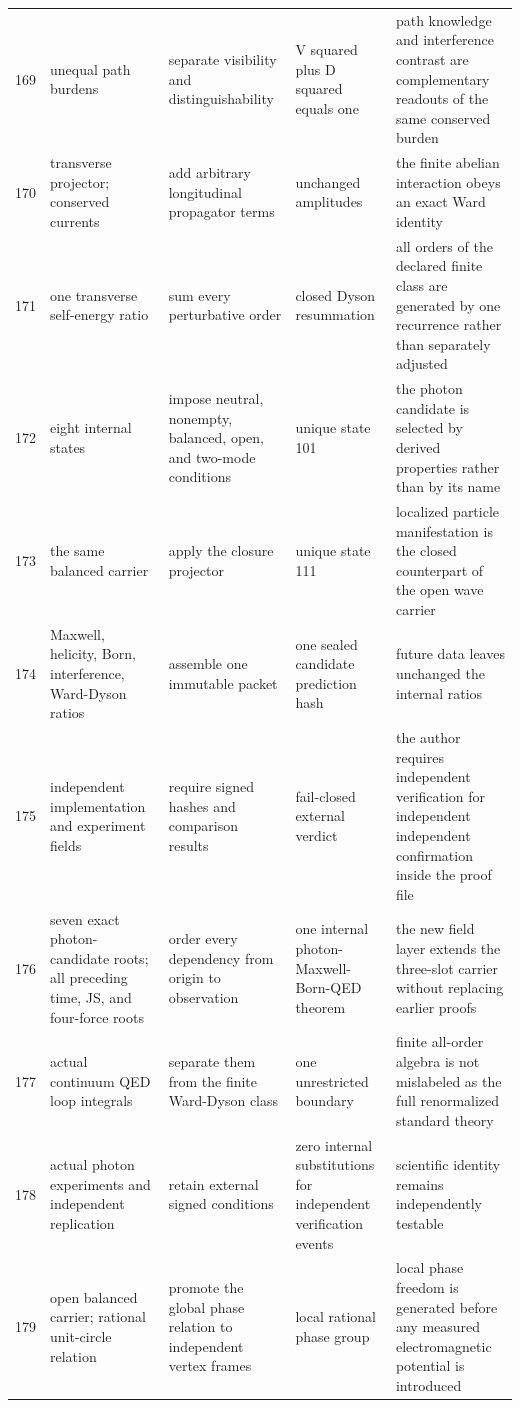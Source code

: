 \documentclass[11pt]{article}
\numberwithin{equation}{section}
\theoremstyle{remark}
\begin{document}
\begin{landscape}
\begin{longtable}{p{0.65cm}p{3.5cm}p{4.0cm}p{4.0cm}p{4.6cm}}
169&unequal path burdens&separate visibility and distinguishability&V squared plus D squared equals one&path knowledge and interference contrast are complementary readouts of the same conserved burden\\
170&transverse projector; conserved currents&add arbitrary longitudinal propagator terms&unchanged amplitudes&the finite abelian interaction obeys an exact Ward identity\\
171&one transverse self-energy ratio&sum every perturbative order&closed Dyson resummation&all orders of the declared finite class are generated by one recurrence rather than separately adjusted\\
172&eight internal states&impose neutral, nonempty, balanced, open, and two-mode conditions&unique state 101&the photon candidate is selected by derived properties rather than by its name\\
173&the same balanced carrier&apply the closure projector&unique state 111&localized particle manifestation is the closed counterpart of the open wave carrier\\
174&Maxwell, helicity, Born, interference, Ward-Dyson ratios&assemble one immutable packet&one sealed candidate prediction hash&future data leaves unchanged the internal ratios\\
175&independent implementation and experiment fields&require signed hashes and comparison results&fail-closed external verdict&the author requires independent verification for independent independent confirmation inside the proof file\\
176&seven exact photon-candidate roots; all preceding time, JS, and four-force roots&order every dependency from origin to observation&one internal photon-Maxwell-Born-QED theorem&the new field layer extends the three-slot carrier without replacing earlier proofs\\
177&actual continuum QED loop integrals&separate them from the finite Ward-Dyson class&one unrestricted boundary&finite all-order algebra is not mislabeled as the full renormalized standard theory\\
178&actual photon experiments and independent replication&retain external signed conditions&zero internal substitutions for independent verification events&scientific identity remains independently testable\\
179&open balanced carrier; rational unit-circle relation&promote the global phase relation to independent vertex frames&local rational phase group&local phase freedom is generated before any measured electromagnetic potential is introduced\\

\end{longtable}
\end{landscape}
\end{document}
